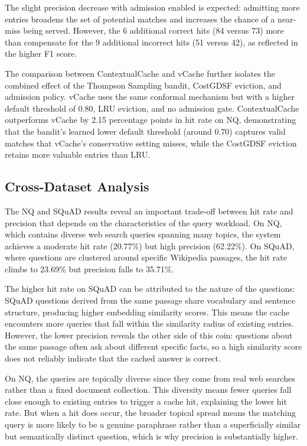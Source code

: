 \documentclass[conference]{IEEEtran}
\begin{document}
The slight precision decrease with admission enabled is expected: admitting more entries broadens the set of potential matches and increases the chance of a near-miss being served. However, the 6 additional correct hits (84 versus 73) more than compensate for the 9 additional incorrect hits (51 versus 42), as reflected in the higher F1 score.

The comparison between ContextualCache and vCache further isolates the combined effect of the Thompson Sampling bandit, CostGDSF eviction, and admission policy. vCache uses the same conformal mechanism but with a higher default threshold of 0.80, LRU eviction, and no admission gate. ContextualCache outperforms vCache by 2.15 percentage points in hit rate on NQ, demonstrating that the bandit's learned lower default threshold (around 0.70) captures valid matches that vCache's conservative setting misses, while the CostGDSF eviction retains more valuable entries than LRU.

\subsection{Cross-Dataset Analysis}

The NQ and SQuAD results reveal an important trade-off between hit rate and precision that depends on the characteristics of the query workload. On NQ, which contains diverse web search queries spanning many topics, the system achieves a moderate hit rate (20.77\%) but high precision (62.22\%). On SQuAD, where questions are clustered around specific Wikipedia passages, the hit rate climbs to 23.69\% but precision falls to 35.71\%.

The higher hit rate on SQuAD can be attributed to the nature of the questions: SQuAD questions derived from the same passage share vocabulary and sentence structure, producing higher embedding similarity scores. This means the cache encounters more queries that fall within the similarity radius of existing entries. However, the lower precision reveals the other side of this coin: questions about the same passage often ask about different specific facts, so a high similarity score does not reliably indicate that the cached answer is correct.

On NQ, the queries are topically diverse since they come from real web searches rather than a fixed document collection. This diversity means fewer queries fall close enough to existing entries to trigger a cache hit, explaining the lower hit rate. But when a hit does occur, the broader topical spread means the matching query is more likely to be a genuine paraphrase rather than a superficially similar but semantically distinct question, which is why precision is substantially higher.
\end{document}
